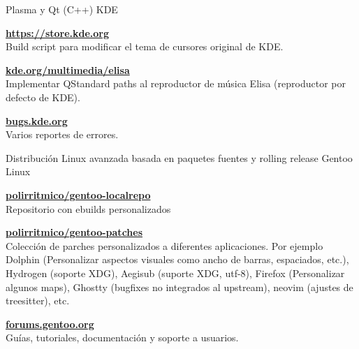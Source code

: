 \begin{cventries}
  \cventry
    {Plasma y Qt (C++)} %
    {KDE} %
    {} %
    {} %
    {
    \begin{cvitems} %
      \item {\textbf{\href{https://store.kde.org/p/2075700}{https://store.kde.org}}\\ Build script para modificar el tema de cursores original de KDE.}
      \item {\textbf{\href{https://invent.kde.org/multimedia/elisa/-/merge_requests/478\#note_741609}{kde.org/multimedia/elisa}}\\ Implementar QStandard paths al reproductor de música Elisa (reproductor por defecto de KDE).}
      \item {\textbf{\href{https://bugs.kde.org/buglist.cgi?bug_status=UNCONFIRMED&bug_status=CONFIRMED&bug_status=ASSIGNED&bug_status=REOPENED&email1=ebray187&emailassigned_to1=1&emailcc1=1&emaillongdesc1=1&emailreporter1=1&emailtype1=substring&order=Importance&query_format=advanced}{bugs.kde.org}}\\ Varios reportes de errores.}
    \end{cvitems}
    }

  \cventry
    {Distribución Linux avanzada basada en paquetes fuentes y rolling release} %
    {Gentoo Linux} %
    {} %
    {} %
    {
    \begin{cvitems} %
      \item {\textbf{\href{https://github.com/polirritmico/gentoo-localrepo}{polirritmico/gentoo-localrepo}}\\ Repositorio con ebuilds personalizados}
      \item {\textbf{\href{https://github.com/polirritmico/gentoo-patches}{polirritmico/gentoo-patches}}\\ Colección de parches personalizados a diferentes aplicaciones. Por ejemplo Dolphin (Personalizar aspectos visuales como ancho de barras, espaciados, etc.), Hydrogen (soporte XDG), Aegisub (suporte XDG, utf-8), Firefox (Personalizar algunos maps), Ghostty (bugfixes no integrados al upstream), neovim (ajustes de treesitter), etc.}
      \item {\textbf{\href{https://forums.gentoo.org/search.php?search_author=ebray187}{forums.gentoo.org}}\\ Guías, tutoriales, documentación y soporte a usuarios.}
    \end{cvitems}
    }


\end{cventries}
